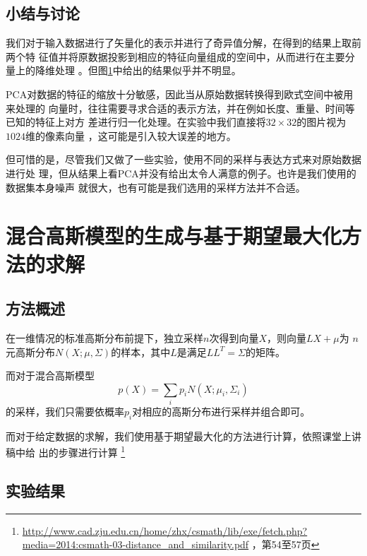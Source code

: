 \documentclass[10pt,a4paper]{article}
\theoremstyle{mythm}%
\numberwithin{equation}{section}
\begin{document}
\begin{CJK*}{UTF8}{wqyzh}
\begin{figure}[h]
{        \label{fig:pca-2}
    }
    \caption{
    }{}
    \label{fig:pca}
\end{figure}


\subsection{小结与讨论}

\label{sec:2nd-conclusion}

我们对于输入数据进行了矢量化的表示并进行了奇异值分解，在得到的结果上取前两个特
征值并将原数据投影到相应的特征向量组成的空间中，从而进行在主要分量上的降维处理
。但图\ref{fig:pca}中给出的结果似乎并不明显。

PCA对数据的特征的缩放十分敏感，因此当从原始数据转换得到欧式空间中被用来处理的
向量时，往往需要寻求合适的表示方法，并在例如长度、重量、时间等已知的特征上对方
差进行归一化处理。在实验中我们直接将$32 \times 32$的图片视为$1024$维的像素向量
，这可能是引入较大误差的地方。

但可惜的是，尽管我们又做了一些实验，使用不同的采样与表达方式来对原始数据进行处
理，但从结果上看PCA并没有给出太令人满意的例子。也许是我们使用的数据集本身噪声
就很大，也有可能是我们选用的采样方法并不合适。



\section{混合高斯模型的生成与基于期望最大化方法的求解}

\subsection{方法概述}

在一维情况的标准高斯分布前提下，独立采样$n$次得到向量$X$，则向量$LX + \mu$为
$n$元高斯分布$N(X;\mu, \Sigma)$的样本，其中$L$是满足$LL^T=\Sigma$的矩阵。

而对于混合高斯模型
\begin{equation}
    p(X) = \sum_i p_i N(X;\mu_i, \Sigma_i)
\end{equation}
的采样，我们只需要依概率$p_i$对相应的高斯分布进行采样并组合即可。

而对于给定数据的求解，我们使用基于期望最大化的方法进行计算，依照课堂上讲稿中给
出的步骤进行计算
\footnote{\url{http://www.cad.zju.edu.cn/home/zhx/csmath/lib/exe/fetch.php?media=2014:csmath-03-distance_and_similarity.pdf}
，第54至57页}


\subsection{实验结果}


\end{CJK*}
\end{document}
